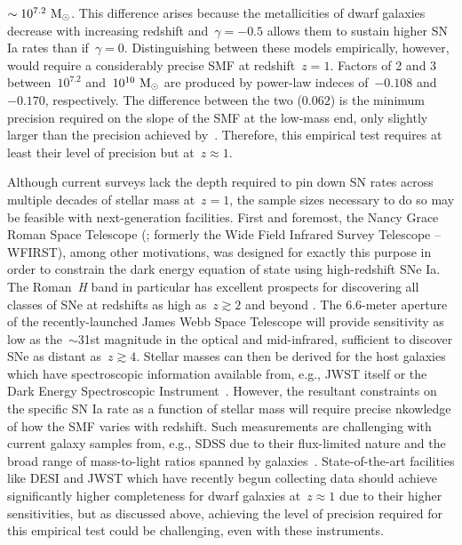 \documentclass[ms.tex]{subfiles}
\begin{document}
$\sim 10^{7.2}~\text{M}_\odot$.
This difference arises because the metallicities of dwarf galaxies decrease
with increasing redshift and~$\gamma = -0.5$ allows them to sustain higher
SN Ia rates than if~$\gamma = 0$.
Distinguishing between these models empirically, however, would require a
considerably precise SMF at redshift~$z = 1$.
Factors of 2 and 3 between~$10^{7.2}$ and~$10^{10}~\text{M}_\odot$ are produced by
power-law indeces of~$-0.108$ and~$-0.170$, respectively. 
The difference between the two ($0.062$) is the minimum precision required
on the slope of the SMF at the low-mass end, only slightly larger than the
precision achieved by~\citet[][$\pm 0.05$, see their Fig. 13]{Baldry2012}.
Therefore, this empirical test requires at least their level of precision but
at~$z \approx 1$.
\par
Although current surveys lack the depth required to pin down SN rates across
multiple decades of stellar mass at~$z = 1$, the sample sizes necessary to do
so may be feasible with next-generation facilities.
First and foremost, the Nancy Grace Roman Space Telescope (\citealp{Spergel2013,
Spergel2015}; formerly the Wide Field Infrared Survey Telescope -- WFIRST),
among other motivations, was designed for exactly this purpose in order to
constrain the dark energy equation of state using high-redshift SNe Ia.
The Roman~\textit{H} band in particular has excellent prospects for discovering
all classes of SNe at redshifts as high as~$z \gtrsim 2$ and beyond
\citep{Petrushevska2016}.
The 6.6-meter aperture of the recently-launched James Webb Space Telescope
\citep[JWST;][]{Gardner2006} will provide sensitivity as low as the~$\sim$31st
magnitude in the optical and mid-infrared, sufficient to discover SNe as
distant as~$z \gtrsim 4$.
Stellar masses can then be derived for the host galaxies which have
spectroscopic information available from, e.g., JWST itself or the Dark Energy
Spectroscopic Instrument~\citep[DESI;][]{Desi2016}.
However, the resultant constraints on the specific SN Ia rate as a function of
stellar mass will require precise nkowledge of how the SMF varies with redshift.
Such measurements are challenging with current galaxy samples from, e.g.,
SDSS due to their flux-limited nature and the broad range of mass-to-light
ratios spanned by galaxies~\citep{Weigel2016}.
State-of-the-art facilities like DESI and JWST which have recently begun
collecting data should achieve significantly higher completeness for dwarf
galaxies at~$z \approx 1$ due to their higher sensitivities, but as discussed
above, achieving the level of precision required for this empirical test could
be challenging, even with these instruments.
\end{document}
